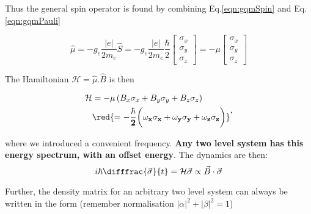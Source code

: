   \noindent Thus the general spin operator is found by combining Eq.\eqref{eqn:gqmSpin} and Eq. \ref{eqn:gqmPauli}
  
  \begin{equation}
  \hat{\mu} = -g_e\frac{|e|}{2m_e}\hat{S} = -g_e\frac{|e|}{2m_e}\frac{\hbar}{2}\begin{bmatrix}
  \sigma_x\\\sigma_y\\\sigma_z
  \end{bmatrix} = -\mu\begin{bmatrix}
  \sigma_x\\\sigma_y\\\sigma_z
  \end{bmatrix}
  \end{equation}
  
  \noindent The Hamiltonian $\mathcal{H} = \hat{\mu}.\hat{B}$ is then
  
  \begin{equation}
  \begin{aligned}
  \mathcal{H} & = -\mu\left(B_x\sigma_x+B_y\sigma_y+B_z\sigma_z\right)\\
  & \red{\mathbf{ = -\frac{\hbar}{2}\bigg(\omega_x\sigma_x+\omega_y\sigma_y+\omega_z\sigma_z\bigg)}}
  \end{aligned},
  \end{equation}
  
  \noindent where we introduced a convenient frequency. \textbf{Any two level system has this energy spectrum, with an offset energy}. The dynamics are then:
  \begin{equation}\label{eqn:evolutionBloch}
  	i\hbar\difffrac{\vec{\sigma}}{t} = \mathcal{H}\vec{\sigma} \propto \vec{B}\cdot\vec{\sigma}
  \end{equation}
  
  Further, the density matrix for an arbitrary two level system can always be written in the form (remember normalisation $|\alpha|^2+|\beta|^2 = 1$)
  
